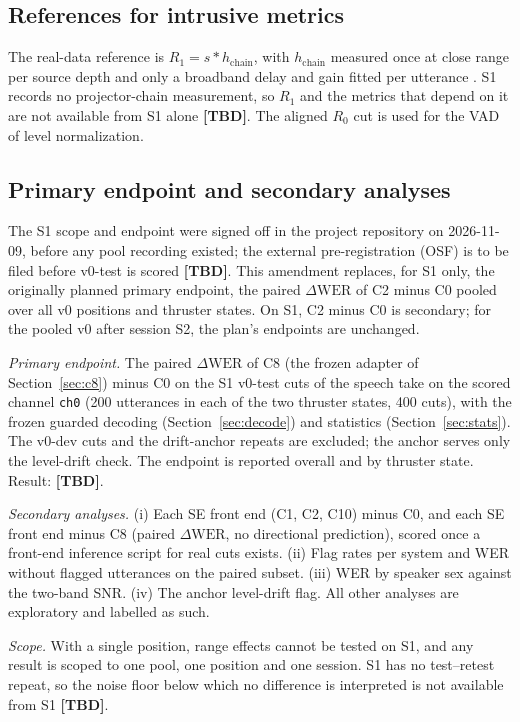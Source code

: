 \documentclass[conference]{IEEEtran}
\newcommand{\tbd}{\textbf{[TBD]}}
\begin{document}
\subsection{References for intrusive metrics}
\label{sec:refs}
The real-data reference is $R_1 = s * h_{\mathrm{chain}}$, with $h_{\mathrm{chain}}$ measured once at
close range per source depth and only a broadband delay and gain fitted per utterance
\cite{yang2024realman}. S1 records no projector-chain measurement, so $R_1$ and
the metrics that depend on it are not available from S1 alone \tbd. The aligned $R_0$ cut is used for
the VAD of level normalization.

\subsection{Primary endpoint and secondary analyses}
\label{sec:endpoint}
The S1 scope and endpoint were signed off in the project repository on 2026-11-09, before any pool
recording existed; the external pre-registration (OSF) is to be filed before v0-test is scored \tbd.
This amendment replaces, for S1 only, the originally planned primary endpoint, the paired
$\Delta\mathrm{WER}$ of C2 minus C0 pooled over all v0 positions and thruster states. On S1, C2 minus
C0 is secondary; for the pooled v0 after session S2, the plan's endpoints are unchanged.

\textit{Primary endpoint.} The paired $\Delta\mathrm{WER}$ of C8 (the frozen adapter of
Section~\ref{sec:c8}) minus C0 on the S1 v0-test cuts of the speech take on the scored channel
\texttt{ch0} (200 utterances in each of the two thruster states, 400 cuts), with the frozen guarded
decoding (Section~\ref{sec:decode}) and statistics (Section~\ref{sec:stats}). The v0-dev cuts and the
drift-anchor repeats are excluded; the anchor serves only the level-drift check. The endpoint is reported overall and by thruster state. Result: \tbd.

\textit{Secondary analyses.} (i) Each SE front end (C1, C2, C10) minus C0, and each SE front end
minus C8 (paired $\Delta\mathrm{WER}$, no directional prediction), scored once a front-end inference
script for real cuts exists. (ii) Flag rates per system and WER without flagged
utterances on the paired subset. (iii) WER by speaker sex against the two-band SNR. (iv) The anchor
level-drift flag. All other analyses are exploratory and labelled as such.

\textit{Scope.} With a single position, range effects cannot be tested on S1, and any result is
scoped to one pool, one position and one session. S1 has no test--retest repeat, so the noise floor
below which no difference is interpreted is not available from S1 \tbd.
\end{document}
